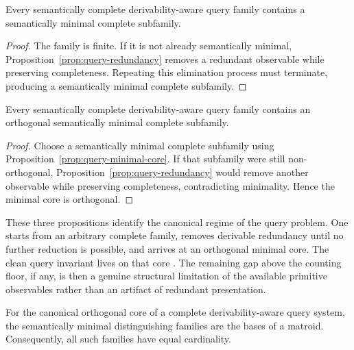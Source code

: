 \begin{proposition}\label{prop:query-minimal-core}
Every semantically complete derivability-aware query family contains a semantically minimal complete subfamily.
\end{proposition}

\begin{proof}
The family is finite. If it is not already semantically minimal, Proposition~\ref{prop:query-redundancy} removes a redundant observable while preserving completeness. Repeating this elimination process must terminate, producing a semantically minimal complete subfamily.
\end{proof}

\begin{proposition}\label{prop:query-orthogonal-core}
Every semantically complete derivability-aware query family contains an orthogonal semantically minimal complete subfamily.
\end{proposition}

\begin{proof}
Choose a semantically minimal complete subfamily using Proposition~\ref{prop:query-minimal-core}. If that subfamily were still non-orthogonal, Proposition~\ref{prop:query-redundancy} would remove another observable while preserving completeness, contradicting minimality. Hence the minimal core is orthogonal.
\end{proof}

These three propositions identify the canonical regime of the query problem. One starts from an arbitrary complete family, removes derivable redundancy until no further reduction is possible, and arrives at an orthogonal minimal core. The clean query invariant lives on that core \cite{Welsh1976}. The remaining gap above the counting floor, if any, is then a genuine structural limitation of the available primitive observables rather than an artifact of redundant presentation.

\begin{theorem}\label{thm:matroid-bases}
For the canonical orthogonal core of a complete derivability-aware query system, the semantically minimal distinguishing families are the bases of a matroid. Consequently, all such families have equal cardinality.
\end{theorem}

